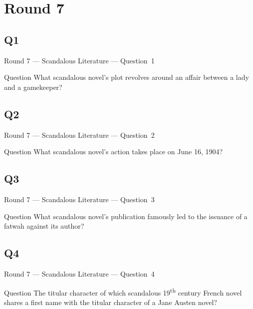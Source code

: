 \documentclass[11pt]{beamer}
\begin{document}
\section{Round 7}
\subsection*{Q1}
\begin{frame}[t]{Round 7 --- Scandalous Literature --- \mbox{Question 1}}
\vspace{-0.5em}
\begin{block}{Question}
What scandalous novel's plot revolves around an affair between a lady and a gamekeeper?
\end{block}
\end{frame}
\subsection*{Q2}
\begin{frame}[t]{Round 7 --- Scandalous Literature --- \mbox{Question 2}}
\vspace{-0.5em}
\begin{block}{Question}
What scandalous novel's action takes place on June 16, 1904?
\end{block}
\end{frame}
\subsection*{Q3}
\begin{frame}[t]{Round 7 --- Scandalous Literature --- \mbox{Question 3}}
\vspace{-0.5em}
\begin{block}{Question}
What scandalous novel's publication famously led to the issuance of  a fatwah against its author?
\end{block}
\end{frame}
\subsection*{Q4}
\begin{frame}[t]{Round 7 --- Scandalous Literature --- \mbox{Question 4}}
\vspace{-0.5em}
\begin{block}{Question}
The titular character of which scandalous 19\textsuperscript{th} century French novel shares a first name with the titular character of a Jane Austen novel? 
\end{block}
\end{frame}
\end{document}
